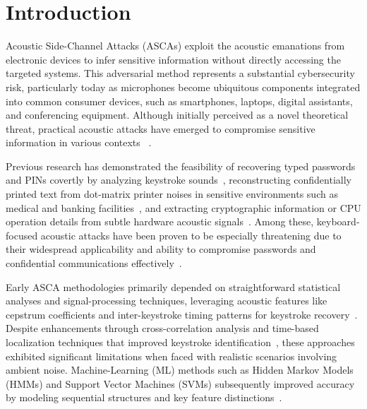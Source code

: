 \section{Introduction}
\label{sec:intro}

Acoustic Side-Channel Attacks (ASCAs) exploit the acoustic emanations from electronic devices to infer sensitive information without directly accessing the targeted systems. This adversarial method represents a substantial cybersecurity risk, particularly today as microphones become ubiquitous components integrated into common consumer devices, such as smartphones, laptops, digital assistants, and conferencing equipment. Although initially perceived as a novel theoretical threat, practical acoustic attacks have emerged to compromise sensitive information in various contexts ~\cite{zhuang2009keyboard, carrara2015acoustic, compagno2017don, mehrnezhad2018stealing}.

Previous research has demonstrated the feasibility of recovering typed passwords and PINs covertly by analyzing keystroke sounds~\cite{zhuang2009keyboard, asonov2004keyboard, berger2006dictionary, anand2018keyboard, harrison2023practical}, reconstructing confidentially printed text from dot-matrix printer noises in sensitive environments such as medical and banking facilities~\cite{backes2010acoustic}, and extracting cryptographic information or CPU operation details from subtle hardware acoustic signals~\cite{shamir2004acoustic, ninan2024second}. Among these, keyboard-focused acoustic attacks have been proven to be especially threatening due to their widespread applicability and ability to compromise passwords and confidential communications effectively~\cite{zhuang2009keyboard, asonov2004keyboard, harrison2023practical, halevi2012closer}.

Early ASCA methodologies primarily depended on straightforward statistical analyses and signal-processing techniques, leveraging acoustic features like cepstrum coefficients and inter-keystroke timing patterns for keystroke recovery~\cite{zhuang2009keyboard}. Despite enhancements through cross-correlation analysis and time-based localization techniques that improved keystroke identification~\cite{berger2006dictionary, de2019differential}, these approaches exhibited significant limitations when faced with realistic scenarios involving ambient noise. Machine-Learning (ML) methods such as Hidden Markov Models (HMMs) and Support Vector Machines (SVMs) subsequently improved accuracy by modeling sequential structures and key feature distinctions~\cite{backes2010acoustic,wang2016accurate}.

